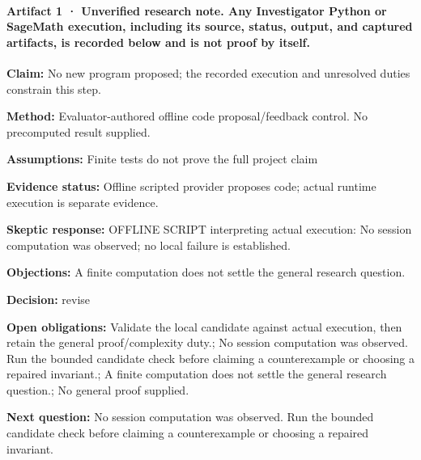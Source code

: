 \documentclass[11pt]{article}
\begin{document}
\paragraph{Artifact 1 · Unverified research note. Any Investigator Python or SageMath execution, including its source, status, output, and captured artifacts, is recorded below and is not proof by itself.}
\textbf{Claim:} No new program proposed; the recorded execution and unresolved duties constrain this step.\par
\textbf{Method:} Evaluator-authored offline code proposal/feedback control. No precomputed result supplied.\par
\textbf{Assumptions:} Finite tests do not prove the full project claim\par
\textbf{Evidence status:} Offline scripted provider proposes code; actual runtime execution is separate evidence.\par
\textbf{Skeptic response:} OFFLINE SCRIPT interpreting actual execution: No session computation was observed; no local failure is established.\par
\textbf{Objections:} A finite computation does not settle the general research question.\par
\textbf{Decision:} revise\par
\textbf{Open obligations:} Validate the local candidate against actual execution, then retain the general proof/complexity duty.; No session computation was observed. Run the bounded candidate check before claiming a counterexample or choosing a repaired invariant.; A finite computation does not settle the general research question.; No general proof supplied.\par
\textbf{Next question:} No session computation was observed. Run the bounded candidate check before claiming a counterexample or choosing a repaired invariant.\par
\end{document}
